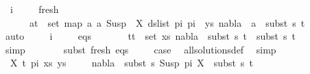\begin{isabellebody}
\ {}\ i{\isacharparenleft}{\kern0pt}{}{\isacharparenright}{\kern0pt}\isanewline
\ \ \ \isamarkupfalse%
\ fresh{\isacharcolon}{\kern0pt}\ \isanewline
\ \ \ \ \ {\isachardoublequoteopen}{\isasymforall}\ {\isacharparenleft}{\kern0pt}a{\isacharcomma}{\kern0pt}t{\isacharparenright}{\kern0pt}\ {\isasymin}\ set\ {\isacharparenleft}{\kern0pt}map\ {\isacharparenleft}{\kern0pt}{\isasymlambda}a{\isachardot}{\kern0pt}\ {\isacharparenleft}{\kern0pt}a{\isacharcomma}{\kern0pt}\ Susp\ {\isacharbrackleft}{\kern0pt}{\isacharbrackright}{\kern0pt}\ X{\isacharparenright}{\kern0pt}{\isacharparenright}{\kern0pt}\ {\isacharparenleft}{\kern0pt}ds{\isacharunderscore}{\kern0pt}list\ pi{}\ pi{}{\isacharparenright}{\kern0pt}\ {\isacharat}{\kern0pt}\ ys{\isacharparenright}{\kern0pt}{\isachardot}{\kern0pt}\ nabla{}\ {\isasymturnstile}\ a\ {\isasymsharp}\ subst\ s{}\ t{\isachardoublequoteclose}\isanewline
\ \ \ \ \isamarkupfalse%
\ auto\isanewline
\isanewline
\ \ \ \isamarkupfalse%
\ i{\isacharparenleft}{\kern0pt}{}{\isacharparenright}{\kern0pt}\isanewline
\ \ \ \isamarkupfalse%
\ eqs{\isacharcolon}{\kern0pt}\ \ \isanewline
\ \ \ \ {\isachardoublequoteopen}{\isasymforall}\ {\isacharparenleft}{\kern0pt}t{}{\isacharcomma}{\kern0pt}t{}{\isacharparenright}{\kern0pt}\ {\isasymin}\ set\ xs{\isachardot}{\kern0pt}\ nabla{}\ {\isasymturnstile}\ subst\ s{}\ t{}\ {\isasymapprox}\ subst\ s{}\ t{}{\isachardoublequoteclose}\isanewline
\ \ \ \ \ \isamarkupfalse%
\ simp\isanewline
\ \ \isanewline
\ \ \ \isamarkupfalse%
\ subst\ fresh\ eqs\isanewline
\ \ \ \isamarkupfalse%
\ {\isacharquery}{\kern0pt}case\ \isamarkupfalse%
\ all{\isacharunderscore}{\kern0pt}solutions{\isacharunderscore}{\kern0pt}def\ \isamarkupfalse%
\ simp\isanewline
\ \isamarkupfalse%
\isanewline
\ \ \ \isamarkupfalse%
\ {\isacharparenleft}{\kern0pt}{}\ X\ t{\isacharprime}{\kern0pt}\ pi\ xs\ ys{\isacharparenright}{\kern0pt}\isanewline
\ \ \ \isamarkupfalse%
\ {\isachardoublequoteopen}nabla{}\ {\isasymturnstile}\ subst\ s{}\ {\isacharparenleft}{\kern0pt}Susp\ pi\ X{\isacharparenright}{\kern0pt}\ {\isasymapprox}\ subst\ s{}\ t{\isacharprime}{\kern0pt}{\isachardoublequoteclose}\isanewline
\ \ \ \ \ \isamarkupfalse%

\end{isabellebody}
